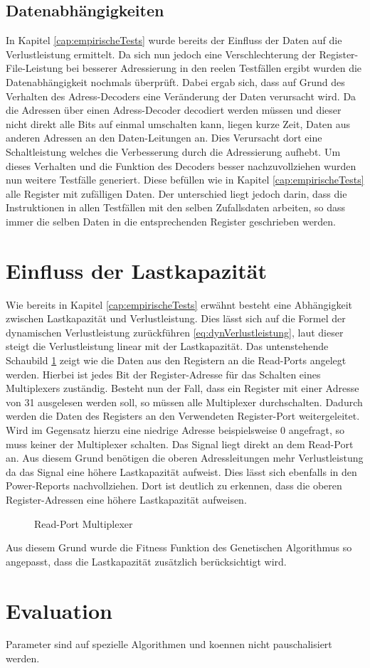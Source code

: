 \subsection{Datenabhängigkeiten}
In Kapitel \ref{cap:empirischeTests} wurde bereits der Einfluss der Daten auf die Verlustleistung ermittelt. Da sich nun jedoch eine Verschlechterung der Register-File-Leistung bei besserer Adressierung in den reelen Testfällen ergibt wurden die Datenabhängigkeit nochmals überprüft. Dabei ergab sich, dass auf Grund des Verhalten des Adress-Decoders eine Veränderung der Daten verursacht wird. Da die Adressen über einen Adress-Decoder decodiert werden müssen und dieser nicht direkt alle Bits auf einmal umschalten kann, liegen kurze Zeit, Daten aus anderen Adressen an den Daten-Leitungen an. Dies Verursacht dort eine Schaltleistung welches die Verbesserung durch die Adressierung aufhebt.
Um dieses Verhalten und die Funktion des Decoders besser nachzuvollziehen wurden nun weitere Testfälle generiert. Diese befüllen wie in Kapitel \ref{cap:empirischeTests} alle Register mit zufälligen Daten. Der unterschied liegt jedoch darin, dass die Instruktionen in allen Testfällen mit den selben Zufallsdaten arbeiten, so dass immer die selben Daten in die entsprechenden Register geschrieben werden.

\section{Einfluss der Lastkapazität}
 \label{cap:lastkapa}
Wie bereits in Kapitel \ref{cap:empirischeTests} erwähnt besteht eine Abhängigkeit zwischen Lastkapazität und Verlustleistung. Dies lässt sich auf die Formel der dynamischen Verlustleistung zurückführen \ref{eq:dynVerlustleistung}, laut dieser steigt die Verlustleistung linear mit der Lastkapazität.
Das untenstehende Schaubild \ref{fig:read_port_mux} zeigt wie die Daten aus den Registern an die Read-Ports angelegt werden. Hierbei ist jedes Bit der Register-Adresse für das Schalten eines Multiplexers zuständig. Besteht nun der Fall, dass ein Register mit einer Adresse von 31 ausgelesen werden soll, so müssen alle Multiplexer durchschalten. Dadurch werden die Daten des Registers an den Verwendeten Register-Port weitergeleitet. Wird im Gegensatz hierzu eine niedrige Adresse beispielsweise 0 angefragt, so muss keiner der Multiplexer schalten. Das Signal liegt direkt an dem Read-Port an. Aus diesem Grund benötigen die oberen Adressleitungen mehr Verlustleistung da das Signal eine höhere Lastkapazität aufweist. Dies lässt sich ebenfalls in den Power-Reports nachvollziehen. Dort ist deutlich zu erkennen, dass die oberen Register-Adressen eine höhere Lastkapazität aufweisen. 
\begin{scriptsize}
	\begin{figure}[htbp] 
		\centering
		
		\caption{Read-Port Multiplexer}
		\label{fig:read_port_mux}
	\end{figure}
\end{scriptsize}

Aus diesem Grund wurde die Fitness Funktion des Genetischen Algorithmus so angepasst, dass die Lastkapazität zusätzlich berücksichtigt wird.

\section{Evaluation}
\label{sec:evalutation_verification}



Parameter sind auf spezielle Algorithmen und koennen nicht pauschalisiert werden.